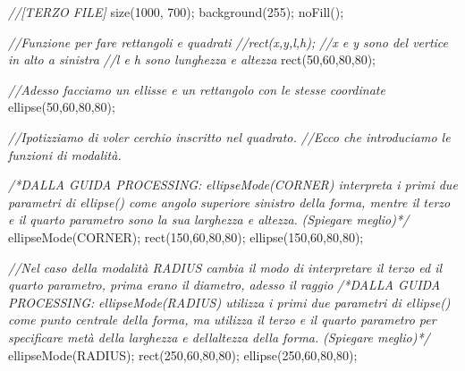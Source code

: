 \documentclass[
]{article}
\newenvironment{Shaded}{}{}
\newcommand{\CommentTok}[1]{\textcolor[rgb]{0.38,0.63,0.69}{\textit{#1}}}
\newcommand{\DecValTok}[1]{\textcolor[rgb]{0.25,0.63,0.44}{#1}}
\newcommand{\FunctionTok}[1]{\textcolor[rgb]{0.02,0.16,0.49}{#1}}
\newcommand{\NormalTok}[1]{#1}
\newcommand{\OperatorTok}[1]{\textcolor[rgb]{0.40,0.40,0.40}{#1}}
\begin{document}
\begin{Shaded}
\begin{Highlighting}[]
\CommentTok{//[TERZO FILE]}
\FunctionTok{size}\OperatorTok{(}\DecValTok{1000}\OperatorTok{,} \DecValTok{700}\OperatorTok{);}
\FunctionTok{background}\OperatorTok{(}\DecValTok{255}\OperatorTok{);}
\FunctionTok{noFill}\OperatorTok{();}

\CommentTok{//Funzione per fare rettangoli e quadrati}
  \CommentTok{//rect(x,y,l,h);}
    \CommentTok{//x e y sono del vertice in alto a sinistra}
    \CommentTok{//l e h sono lunghezza e altezza}
\FunctionTok{rect}\OperatorTok{(}\DecValTok{50}\OperatorTok{,}\DecValTok{60}\OperatorTok{,}\DecValTok{80}\OperatorTok{,}\DecValTok{80}\OperatorTok{);}

\CommentTok{//Adesso facciamo un ellisse e un rettangolo con le stesse coordinate}
\FunctionTok{ellipse}\OperatorTok{(}\DecValTok{50}\OperatorTok{,}\DecValTok{60}\OperatorTok{,}\DecValTok{80}\OperatorTok{,}\DecValTok{80}\OperatorTok{);}

\CommentTok{//Ipotizziamo di voler cerchio inscritto nel quadrato.}
\CommentTok{//Ecco che introduciamo le funzioni di modalità.}

\CommentTok{/*DALLA GUIDA PROCESSING:}
\CommentTok{ellipseMode(CORNER) interpreta i primi due parametri di ellipse() come angolo superiore sinistro della forma, mentre il terzo e il quarto parametro sono la sua larghezza e altezza.}
\CommentTok{(Spiegare meglio)*/}
\FunctionTok{ellipseMode}\OperatorTok{(}\NormalTok{CORNER}\OperatorTok{);}
\FunctionTok{rect}\OperatorTok{(}\DecValTok{150}\OperatorTok{,}\DecValTok{60}\OperatorTok{,}\DecValTok{80}\OperatorTok{,}\DecValTok{80}\OperatorTok{);}
\FunctionTok{ellipse}\OperatorTok{(}\DecValTok{150}\OperatorTok{,}\DecValTok{60}\OperatorTok{,}\DecValTok{80}\OperatorTok{,}\DecValTok{80}\OperatorTok{);}

\CommentTok{//Nel caso della modalità \textquotesingle{}RADIUS\textquotesingle{} cambia il modo di interpretare il terzo ed il quarto parametro, prima erano il diametro, adesso il raggio}
\CommentTok{/*DALLA GUIDA PROCESSING:}
\CommentTok{ellipseMode(RADIUS) utilizza i primi due parametri di ellipse() come punto centrale della forma, ma utilizza il terzo e il quarto parametro per specificare metà della larghezza e dell\textquotesingle{}altezza della forma.}
\CommentTok{(Spiegare meglio)*/}
\FunctionTok{ellipseMode}\OperatorTok{(}\NormalTok{RADIUS}\OperatorTok{);}
\FunctionTok{rect}\OperatorTok{(}\DecValTok{250}\OperatorTok{,}\DecValTok{60}\OperatorTok{,}\DecValTok{80}\OperatorTok{,}\DecValTok{80}\OperatorTok{);}
\FunctionTok{ellipse}\OperatorTok{(}\DecValTok{250}\OperatorTok{,}\DecValTok{60}\OperatorTok{,}\DecValTok{80}\OperatorTok{,}\DecValTok{80}\OperatorTok{);}


\end{Highlighting}
\end{Shaded}
\end{document}
